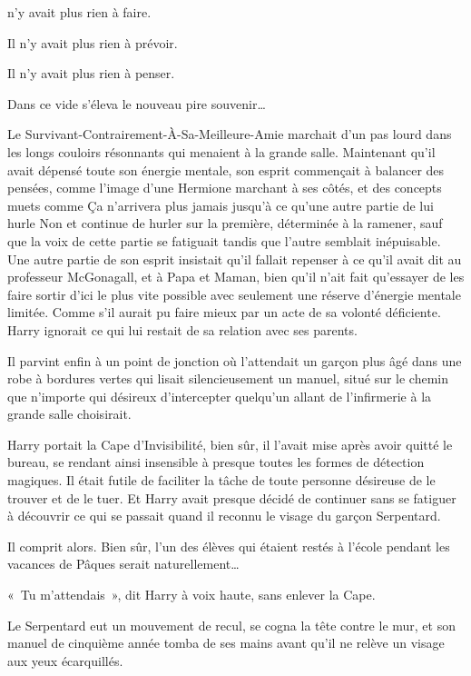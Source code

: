 
 n'y avait plus rien à faire.

\hplettrineextrapara
Il n'y avait plus rien à prévoir.

Il n'y avait plus rien à penser.

Dans ce vide s'éleva le nouveau pire souvenir…

Le Survivant-Contrairement-À-Sa-Meilleure-Amie marchait d'un pas lourd dans les longs couloirs résonnants qui menaient à la grande salle.
Maintenant qu'il avait dépensé toute son énergie mentale, son esprit commençait à balancer des pensées, comme l'image d'une Hermione marchant à ses côtés, et des concepts muets comme Ça n'arrivera plus jamais jusqu'à ce qu'une autre partie de lui hurle Non et continue de hurler sur la première, déterminée à la ramener, sauf que la voix de cette partie se fatiguait tandis que l'autre semblait inépuisable.
Une autre partie de son esprit insistait qu'il fallait repenser à ce qu'il avait dit au professeur McGonagall, et à Papa et Maman, bien qu'il n'ait fait qu'essayer de les faire sortir d'ici le plus vite possible avec seulement une réserve d'énergie mentale limitée.
Comme s'il aurait pu faire mieux par un acte de sa volonté déficiente.
Harry ignorait ce qui lui restait de sa relation avec ses parents.

Il parvint enfin à un point de jonction où l'attendait un garçon plus âgé dans une robe à bordures vertes qui lisait silencieusement un manuel, situé sur le chemin que n'importe qui désireux d'intercepter quelqu'un allant de l'infirmerie à la grande salle choisirait.

Harry portait la Cape d'Invisibilité, bien sûr, il l'avait mise après avoir quitté le bureau, se rendant ainsi insensible à presque toutes les formes de détection magiques.
Il était futile de faciliter la tâche de toute personne désireuse de le trouver et de le tuer.
Et Harry avait presque décidé de continuer sans se fatiguer à découvrir ce qui se passait quand il reconnu le visage du garçon Serpentard.

Il comprit alors.
Bien sûr, l'un des élèves qui étaient restés à l'école pendant les vacances de Pâques serait naturellement…

«~Tu m'attendais~», dit Harry à voix haute, sans enlever la Cape.

Le Serpentard eut un mouvement de recul, se cogna la tête contre le mur, et son manuel de cinquième année tomba de ses mains avant qu'il ne relève un visage aux yeux écarquillés.

